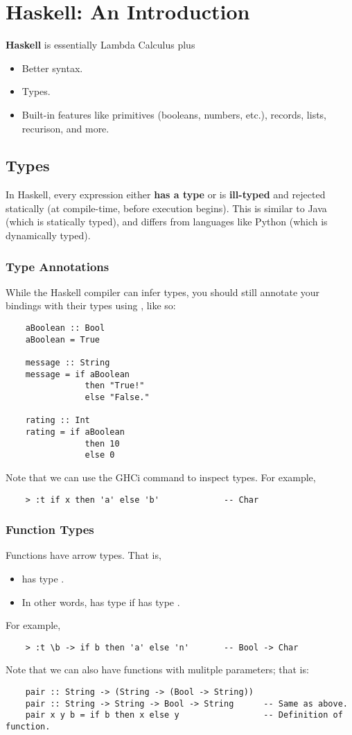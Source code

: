 \documentclass[letterpaper]{article}
\begin{document}
\section{Haskell: An Introduction}
\textbf{Haskell} is essentially Lambda Calculus plus
\begin{itemize}
    \item Better syntax. 
    \item Types.
    \item Built-in features like primitives (booleans, numbers, etc.), records, lists, recurison, and more.
\end{itemize}

\subsection{Types}
In Haskell, every expression either \textbf{has a type} or is \textbf{ill-typed} and rejected statically (at compile-time, before execution begins). This is similar to Java (which is statically typed), and differs from languages like Python (which is dynamically typed).

\subsubsection{Type Annotations}
While the Haskell compiler can infer types, you should still annotate your bindings with their types using \code{::}, like so: 
\begin{verbatim}
    aBoolean :: Bool 
    aBoolean = True 

    message :: String 
    message = if aBoolean
                then "True!"
                else "False."

    rating :: Int 
    rating = if aBoolean
                then 10 
                else 0
\end{verbatim}
Note that we can use the GHCi command  to inspect types. For example, 
\begin{verbatim}
    > :t if x then 'a' else 'b'             -- Char 
\end{verbatim}

\subsubsection{Function Types}
Functions have arrow types. That is, 
\begin{itemize}
    \item {} has type . 
    \item In other words,  has type  if  has type .
\end{itemize}
For example, 
\begin{verbatim}
    > :t \b -> if b then 'a' else 'n'       -- Bool -> Char 
\end{verbatim}
Note that we can also have functions with mulitple parameters; that is:
\begin{verbatim}
    pair :: String -> (String -> (Bool -> String))  
    pair :: String -> String -> Bool -> String      -- Same as above. 
    pair x y b = if b then x else y                 -- Definition of function.
\end{verbatim}
\end{document}

